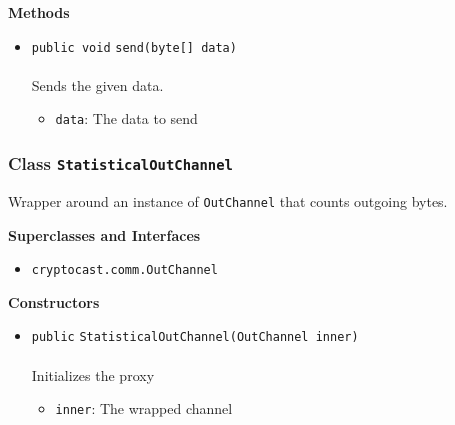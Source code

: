 \textbf{\sffamily Methods}
\begin{itemize}
\item \lstinline|public void| \lstinline|send|\lstinline|(byte[] data)|\\ \\[-0.6em]
Sends the given data.
\begin{itemize}
\item \lstinline|data|: The data to send
\end{itemize}



\end{itemize}

\subsubsection{Class \lstinline|StatisticalOutChannel|}
Wrapper around an instance of \lstinline|OutChannel| that counts outgoing bytes. \\
\noindent\begin{minipage}[t]{5cm}
\vspace{0.3em}
\hspace*{2em}
\vspace{0.3em}
\end{minipage}



\textbf{\sffamily Superclasses and Interfaces}
\begin{itemize}
\item \lstinline|cryptocast.comm.OutChannel|
\end{itemize}


\textbf{\sffamily Constructors}
\begin{itemize}
\item \lstinline|public| \lstinline|StatisticalOutChannel|\lstinline|(OutChannel inner)|\\ \\[-0.6em]
Initializes the proxy
\begin{itemize}
\item \lstinline|inner|: The wrapped channel
\end{itemize}



\end{itemize}


